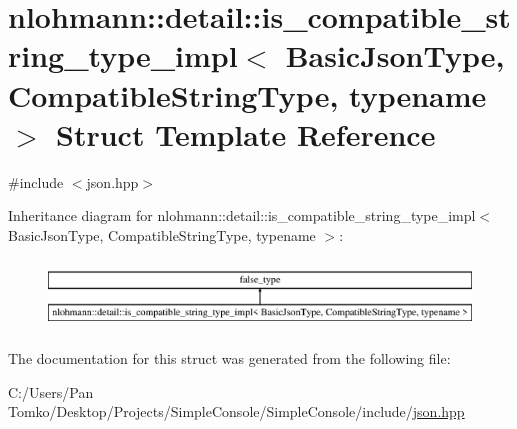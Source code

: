 \hypertarget{structnlohmann_1_1detail_1_1is__compatible__string__type__impl}{}\section{nlohmann\+::detail\+::is\+\_\+compatible\+\_\+string\+\_\+type\+\_\+impl$<$ Basic\+Json\+Type, Compatible\+String\+Type, typename $>$ Struct Template Reference}
\label{structnlohmann_1_1detail_1_1is__compatible__string__type__impl}


{\ttfamily \#include $<$json.\+hpp$>$}

Inheritance diagram for nlohmann\+::detail\+::is\+\_\+compatible\+\_\+string\+\_\+type\+\_\+impl$<$ Basic\+Json\+Type, Compatible\+String\+Type, typename $>$\+:\begin{figure}[H]
\begin{center}
\leavevmode
\includegraphics[height=1.882353cm]{d2/d3a/structnlohmann_1_1detail_1_1is__compatible__string__type__impl}
\end{center}
\end{figure}


The documentation for this struct was generated from the following file\+:\begin{DoxyCompactItemize}
\item 
C\+:/\+Users/\+Pan Tomko/\+Desktop/\+Projects/\+Simple\+Console/\+Simple\+Console/include/\mbox{\hyperlink{json_8hpp}{json.\+hpp}}\end{DoxyCompactItemize}
